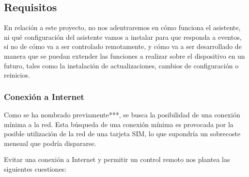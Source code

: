 \subsection{Requisitos}

En relación a este proyecto, no nos adentraremos en cómo funciona el asistente, ni qué configuración del asistente vamos a instalar para que responda a eventos, si no de cómo va a ser controlado remotamente, y cómo va a ser desarrollado de manera que se puedan extender las funciones a realizar sobre el dispositivo en un futuro, tales como la instalación de actualizaciones, cambios de configuración o reinicios.

    \subsubsection{Conexión a Internet}

Como se ha nombrado previamente***, se busca la posibilidad de una conexión mínima a la red. Esta búsqueda de una conexión mínima es provocada por la posible utilización de la red de una tarjeta SIM, lo que supondría un sobrecoste mensual que podría dispararse.

Evitar una conexión a Internet y permitir un control remoto nos plantea las siguientes cuestiones:

